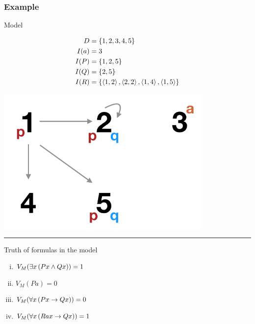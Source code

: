 \documentclass[fleqn,10pt,serif,xcolor=svgnames,xcolor=table,aspectratio=169,handout]{beamer}
\begin{document}
\begin{frame}
  \frametitle{Example}

  \begin{block}{Model}
  \begin{minipage}{0.45\linewidth}
    \centering
    \begin{align*}
      D    & = \left\{1,2,3,4,5\right\}\\
      I(a) & = 3 \\
      I(P) & = \left\{1,2,5\right\} \\
      I(Q) & = \left\{2,5\right\} \\
      I(R) & = \left\{\left \langle 1,2\right\rangle,\left \langle 2,2\right\rangle, \left \langle 1,4\right\rangle, \left \langle 1,5\right\rangle\right\}
    \end{align*}
  \end{minipage}
  \hfill
  \begin{minipage}{0.45\linewidth}
    \includegraphics[width=0.8\textwidth]{../../01-handouts/00-pics/predlog-example-model.png}
  \end{minipage}
\end{block}

  \bigskip \pause

  \hrule

  \bigskip

  \begin{block}{Truth of formulas in the model}
  \begin{multicols}{2}
    \begin{enumerate}[(i)]
      \item $V_{M}(\exists x \thinspace (Px \wedge Qx) ) = 1$
      \item $V_{M}(Pa) = 0$
      \item $V_{M}(\forall x \thinspace (Px \rightarrow Qx)) = 0$
      \item $V_{M}(\forall x \thinspace (Rax \rightarrow Qx)) = 1$
  \end{enumerate}
  \end{multicols}
\end{block}


\end{frame}
\end{document}
